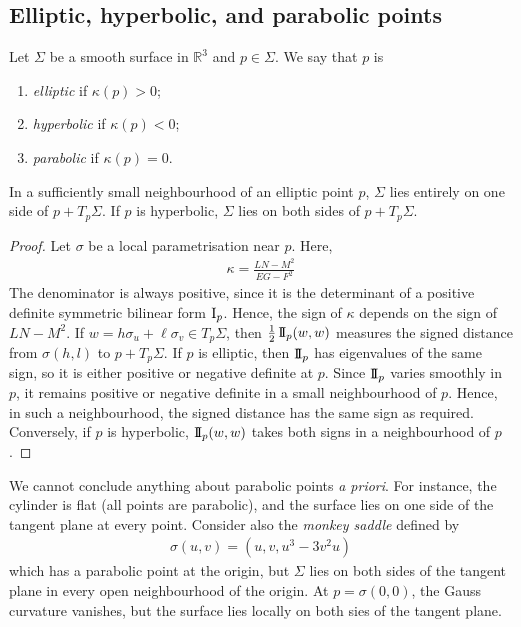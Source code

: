 \subsection{Elliptic, hyperbolic, and parabolic points}
\begin{definition}
	Let $\Sigma$ be a smooth surface in $\mathbb R^3$ and $p \in \Sigma$.
	We say that $p$ is
	\begin{enumerate}
		\item \textit{elliptic} if $\kappa(p) > 0$;
		\item \textit{hyperbolic} if $\kappa(p) < 0$;
		\item \textit{parabolic} if $\kappa(p) = 0$.
	\end{enumerate}
\end{definition}
\begin{lemma}
	In a sufficiently small neighbourhood of an elliptic point $p$, $\Sigma$ lies entirely on one side of $p + T_p \Sigma$.
	If $p$ is hyperbolic, $\Sigma$ lies on both sides of $p + T_p \Sigma$.
\end{lemma}
\begin{proof}
	Let $\sigma$ be a local parametrisation near $p$.
	Here,
	\begin{align*}
		\kappa = \frac{LN-M^2}{EG-F^2}
	\end{align*}
	The denominator is always positive, since it is the determinant of a positive definite symmetric bilinear form $\operatorname{\mathrm{I}}_p$.
	Hence, the sign of $\kappa$ depends on the sign of $LN-M^2$.
	If $w = h \sigma_u + \ell \sigma_v \in T_p \Sigma$, then $\frac{1}{2} \operatorname{\mathrm{I\!I}}_p(w,w)$ measures the signed distance from $\sigma(h,l)$ to $p + T_p \Sigma$.
	If $p$ is elliptic, then $\operatorname{\mathrm{I\!I}}_p$ has eigenvalues of the same sign, so it is either positive or negative definite at $p$.
	Since $\operatorname{\mathrm{I\!I}}_p$ varies smoothly in $p$, it remains positive or negative definite in a small neighbourhood of $p$.
	Hence, in such a neighbourhood, the signed distance has the same sign as required.
	Conversely, if $p$ is hyperbolic, $\operatorname{\mathrm{I\!I}}_p(w,w)$ takes both signs in a neighbourhood of $p$.
\end{proof}
\begin{remark}
	We cannot conclude anything about parabolic points \textit{a priori}.
	For instance, the cylinder is flat (all points are parabolic), and the surface lies on one side of the tangent plane at every point.
	Consider also the \textit{monkey saddle} defined by
	\begin{align*}
		\sigma(u,v) = (u,v,u^3 - 3v^2 u)
	\end{align*}
	which has a parabolic point at the origin, but $\Sigma$ lies on both sides of the tangent plane in every open neighbourhood of the origin.
	At $p = \sigma(0,0)$, the Gauss curvature vanishes, but the surface lies locally on both sies of the tangent plane.
\end{remark}
